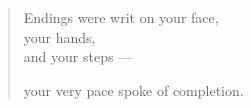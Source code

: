 \documentclass[11pt]{memoir}
\begin{document}
  \begin{paracol}{2}
  \begin{leftcolumn}
  
  \end{leftcolumn}
  \end{paracol}
  \begin{paracol}{2}
  \begin{leftcolumn}
  
  \end{leftcolumn}
  \end{paracol}
  \begin{paracol}{2}
  \begin{leftcolumn}
  
  \end{leftcolumn}
  \end{paracol}
  \begin{paracol}{2}
  \begin{leftcolumn}
  
  \end{leftcolumn}
  \end{paracol}

  \begin{paracol}{2}
  \begin{leftcolumn}
  
  \end{leftcolumn}
  \end{paracol}

  \null
  \newpage
  \null
  \vfill
  \begin{verse}
    Endings were writ on your face,\\
    \vin your hands,\\
    \vin \vin and your steps ---

    your very pace spoke of completion.
  \end{verse}
  \vfill
  \newpage

  \backmatter
  \pagestyle{empty}
  
\end{document}
